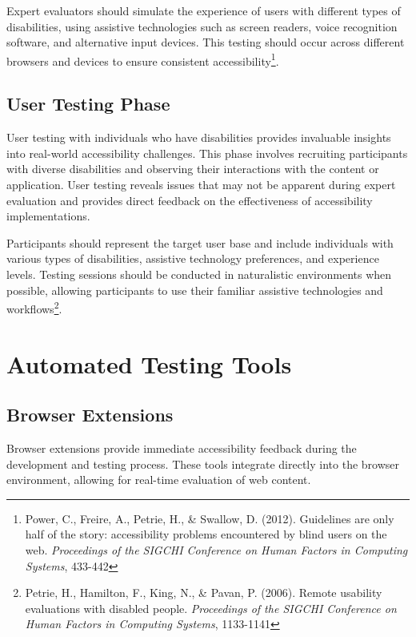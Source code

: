 Expert evaluators should simulate the experience of users with different types of disabilities, using assistive technologies such as screen readers, voice recognition software, and alternative input devices. This testing should occur across different browsers and devices to ensure consistent accessibility\footnote{Power, C., Freire, A., Petrie, H., \& Swallow, D. (2012). Guidelines are only half of the story: accessibility problems encountered by blind users on the web. \textit{Proceedings of the SIGCHI Conference on Human Factors in Computing Systems}, 433-442}.

\subsection{User Testing Phase}

User testing with individuals who have disabilities provides invaluable insights into real-world accessibility challenges. This phase involves recruiting participants with diverse disabilities and observing their interactions with the content or application. User testing reveals issues that may not be apparent during expert evaluation and provides direct feedback on the effectiveness of accessibility implementations.

Participants should represent the target user base and include individuals with various types of disabilities, assistive technology preferences, and experience levels. Testing sessions should be conducted in naturalistic environments when possible, allowing participants to use their familiar assistive technologies and workflows\footnote{Petrie, H., Hamilton, F., King, N., \& Pavan, P. (2006). Remote usability evaluations with disabled people. \textit{Proceedings of the SIGCHI Conference on Human Factors in Computing Systems}, 1133-1141}.

\section{Automated Testing Tools}

\subsection{Browser Extensions}

Browser extensions provide immediate accessibility feedback during the development and testing process. These tools integrate directly into the browser environment, allowing for real-time evaluation of web content.


